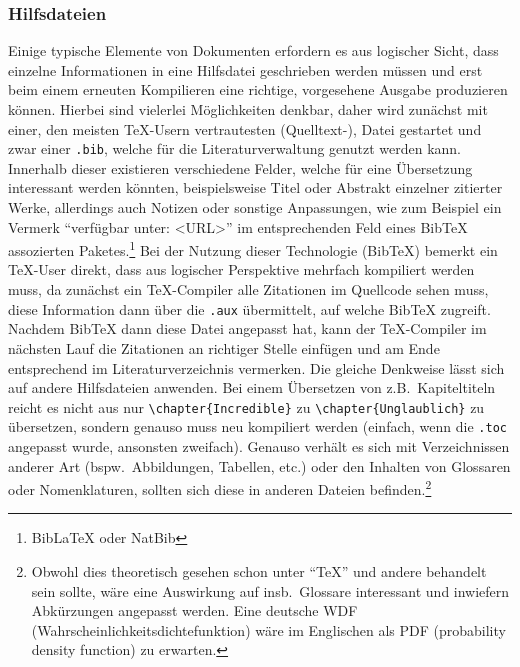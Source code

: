 \subsubsection{Hilfsdateien}\par
Einige typische Elemente von Dokumenten erfordern es aus logischer Sicht, dass einzelne Informationen in eine Hilfsdatei geschrieben werden müssen und erst beim einem erneuten Kompilieren eine richtige, vorgesehene Ausgabe produzieren können. Hierbei sind vielerlei Möglichkeiten denkbar, daher wird zunächst mit einer, den meisten \TeX{}-Usern vertrautesten (Quelltext-), Datei gestartet und zwar einer \texttt{.bib}, welche für die Literaturverwaltung genutzt werden kann. Innerhalb dieser existieren verschiedene Felder, welche für eine Übersetzung interessant werden könnten, beispielsweise Titel oder Abstrakt einzelner zitierter Werke, allerdings auch Notizen oder sonstige Anpassungen, wie zum Beispiel ein Vermerk \enquote{verfügbar unter: <URL>} im entsprechenden Feld eines BibTeX assozierten Paketes.\footnote{BibLaTeX oder NatBib} 
Bei der Nutzung dieser Technologie (BibTeX) bemerkt ein \TeX{}-User direkt, dass aus logischer Perspektive mehrfach kompiliert werden muss, da zunächst ein \TeX{}-Compiler alle Zitationen im Quellcode sehen muss, diese Information dann über die \texttt{.aux} übermittelt, auf welche BibTeX zugreift. Nachdem BibTeX dann diese Datei angepasst hat, kann der \TeX{}-Compiler im nächsten Lauf die Zitationen an richtiger Stelle einfügen und am Ende entsprechend im Literaturverzeichnis vermerken.
Die gleiche Denkweise lässt sich auf andere Hilfsdateien anwenden. Bei einem Übersetzen von z.B.\ Kapiteltiteln reicht es nicht aus nur \verb|\chapter{Incredible}| zu \verb|\chapter{Unglaublich}| zu übersetzen, sondern genauso muss neu kompiliert werden (einfach, wenn die \texttt{.toc} angepasst wurde, ansonsten zweifach). Genauso verhält es sich mit Verzeichnissen anderer Art (bspw.\ Abbildungen, Tabellen, etc.) oder den Inhalten von Glossaren oder Nomenklaturen, sollten sich diese in anderen Dateien befinden.\footnote{Obwohl dies theoretisch gesehen schon unter \enquote{\TeX{}} und andere behandelt sein sollte, wäre eine Auswirkung auf insb.\ Glossare interessant und inwiefern Abkürzungen angepasst werden. Eine deutsche WDF (Wahrscheinlichkeitsdichtefunktion) wäre im Englischen als PDF (probability density function) zu erwarten.}

